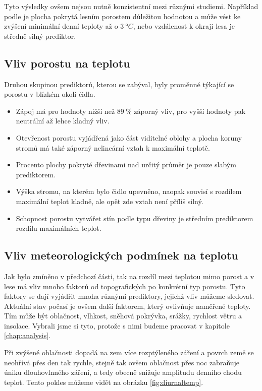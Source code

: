Tyto výsledky ovšem nejsou nutně konzistentní mezi různými studiemi. Například podle \cite{GreiserCaroline2018Mmmi} je plocha pokrytá lesním porostem důležitou hodnotou a může vést ke zvýšení minimální denní teploty až o $\SI{3}{\degree C}$, nebo vzdálenost k okraji lesa je středně silný prediktor.

\subsection{Vliv porostu na teplotu}
Druhou skupinou prediktorů, kterou se \cite{ZellwegerFlorian2019Sdou} zabýval, byly proměnné týkající se porostu v blízkém okolí čidla.

\begin{itemize}
	\item Zápoj má pro hodnoty nižší než $\SI{89}{\%}$ záporný vliv, pro vyšší hodnoty pak neutrální až lehce kladný vliv.
	\item Otevřenost porostu vyjádřená jako část viditelné oblohy a plocha koruny stromů má také záporný nelineární vztah k maximální teplotě.
	\item Procento plochy pokryté dřevinami nad určitý průměr je pouze slabým prediktorem. 
	\item Výška stromu, na kterém bylo čidlo upevněno, naopak souvisí s rozdílem maximální teplot kladně, ale opět zde vztah není příliš silný.
	\item Schopnost porostu vytvářet stín podle typu dřeviny je středním prediktorem rozdílu maximálních teplot.
\end{itemize}

\subsection{Vliv meteorologických podmínek na teplotu}
Jak bylo zmíněno v předchozí části, tak na rozdíl mezi teplotou mimo porost a v lese má vliv mnoho faktorů od topografických po konkrétní typ porostu. Tyto faktory se dají vyjádřit mnoha různými prediktory, jejichž vliv můžeme sledovat. Aktuální stav počasí je ovšem další faktorem, který ovlivňuje naměřené teploty. Tím může být oblačnost, vlhkost, sněhová pokrývka, srážky, rychlost větru a insolace. Vybrali jsme si tyto, protože s nimi budeme pracovat v kapitole \ref{chap:analysis}.

Při zvýšené oblačnosti dopadá na zem více rozptýleného záření a povrch země se neohřívá přes den tak rychle, stejně tak ovšem oblačnost přes noc zabraňuje úniku dlouhovlnného záření, a tedy obecně snižuje amplitudu denního chodu teplot. Tento pokles můžeme vidět na obrázku \ref{fig:diurnaltemp}\cite{arya2001}.

